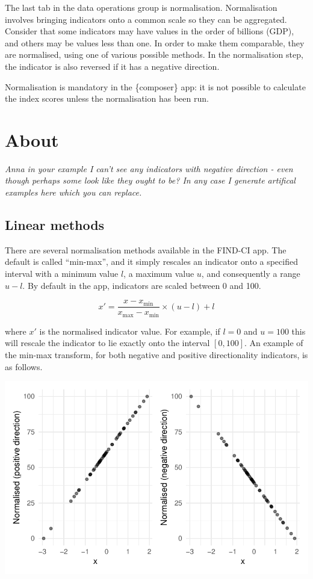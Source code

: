 \documentclass[
  letterpaper,
  DIV=11,
  numbers=noendperiod]{scrreprt}
\begin{document}
The last tab in the data operations group is normalisation.
Normalisation involves bringing indicators onto a common scale so they
can be aggregated. Consider that some indicators may have values in the
order of billions (GDP), and others may be values less than one. In
order to make them comparable, they are normalised, using one of various
possible methods. In the normalisation step, the indicator is also
reversed if it has a negative direction.

Normalisation is mandatory in the \{composer\} app: it is not possible
to calculate the index scores unless the normalisation has been run.

\hypertarget{about-3}{%
\section{About}\label{about-3}}

\emph{Anna in your example I can't see any indicators with negative
direction - even though perhaps some look like they ought to be? In any
case I generate artifical examples here which you can replace.}

\hypertarget{linear-methods}{%
\subsection{Linear methods}\label{linear-methods}}

There are several normalisation methods available in the FIND-CI app.
The default is called ``min-max'', and it simply rescales an indicator
onto a specified interval with a minimum value \(l\), a maximum value
\(u\), and consequently a range \(u-l\). By default in the app,
indicators are scaled between 0 and 100.

\[ x' = \frac{ x - x_{\text{min}} }{ x_{\text{max}} - x_{\text{min}} } \times (u-l) + l\]

where \(x'\) is the normalised indicator value. For example, if \(l=0\)
and \(u=100\) this will rescale the indicator to lie exactly onto the
interval \([0, 100]\). An example of the min-max transform, for both
negative and positive directionality indicators, is as follows.

\includegraphics{normalisation_files/figure-pdf/unnamed-chunk-1-1.pdf}
\end{document}
